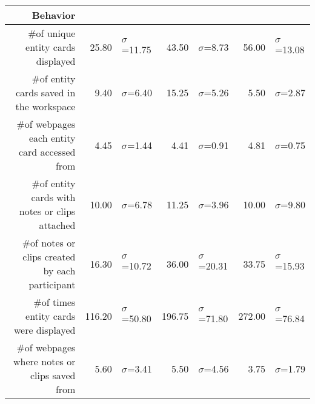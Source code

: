 \begin{table}
\begin{tabular}{ r  r l   r l r l }
	\hline
	\multicolumn{1}{p{0.4\columnwidth}}{Behavior} &
	& &
	& &
	&\\
	\hline
    
	
	\multicolumn{1}{p{0.4\columnwidth}}{\#of unique entity cards displayed} &
    25.80 & $\sigma$=11.75&
    43.50 & $\sigma$=8.73 &
    56.00 & $\sigma$=13.08 \\
    
	\multicolumn{1}{p{0.4\columnwidth}}{\#of entity cards saved in the workspace} &
    9.40 & $\sigma$=6.40 &
    15.25 & $\sigma$=5.26 &
    5.50 & $\sigma$=2.87 \\
    
	\multicolumn{1}{p{0.4\columnwidth}}{\#of webpages each entity card accessed from} &
    4.45 & $\sigma$=1.44 &
    4.41 & $\sigma$=0.91 &
    4.81 & $\sigma$=0.75 \\
    
	\multicolumn{1}{p{0.4\columnwidth}}{\#of entity cards with notes or clips attached} &
    10.00 & $\sigma$=6.78 &
    11.25 & $\sigma$=3.96 &
    10.00 & $\sigma$=9.80 \\
    
    
	\multicolumn{1}{p{0.4\columnwidth}}{\#of notes or clips created by each participant} &
    16.30 & $\sigma$=10.72 &
    36.00 & $\sigma$=20.31 &
    33.75 & $\sigma$=15.93 \\
    
	\multicolumn{1}{p{0.4\columnwidth}}{\#of times entity cards were displayed} &
    116.20 & $\sigma$=50.80 &
    196.75 & $\sigma$=71.80 &
    272.00 & $\sigma$=76.84 \\
    
	\multicolumn{1}{p{0.4\columnwidth}}{\#of webpages where notes or clips saved from} &
    5.60 & $\sigma$=3.41 &
    5.50 & $\sigma$=4.56 &
    3.75 & $\sigma$=1.79 \\
    
    
     

\end{tabular}
\end{table}

